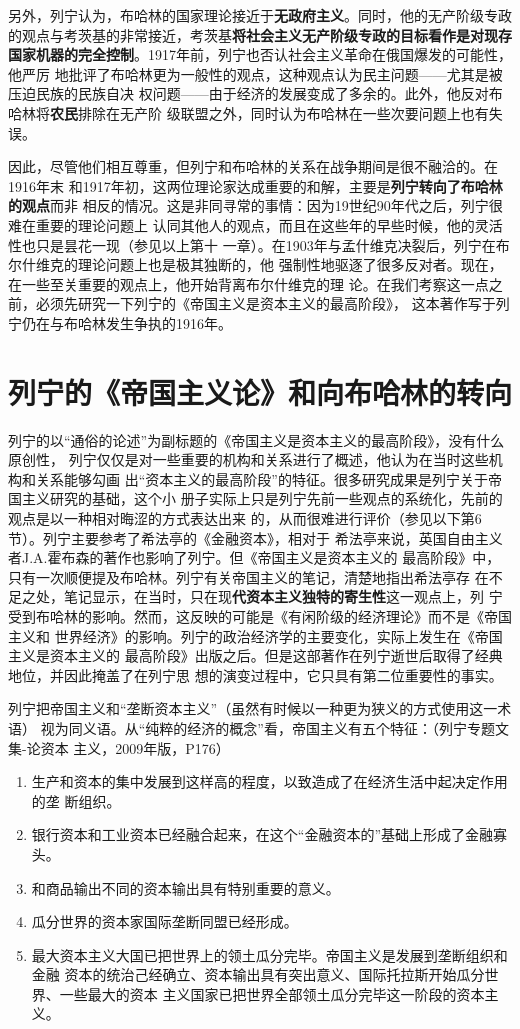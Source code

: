 另外，列宁认为，布哈林的国家理论接近于\textbf{无政府主义}。同时，他的无产阶级专政
的观点与考茨基的非常接近，考茨基\textbf{将社会主义无产阶级专政的目标看作是对现存
  国家机器的完全控制}。1917年前，列宁也否认社会主义革命在俄国爆发的可能性，他严厉
地批评了布哈林更为一般性的观点，这种观点认为民主问题——尤其是被压迫民族的民族自决
权问题——由于经济的发展变成了多余的。此外，他反对布哈林将\textbf{农民}排除在无产阶
级联盟之外，同时认为布哈林在一些次要问题上也有失误。

因此，尽管他们相互尊重，但列宁和布哈林的关系在战争期间是很不融洽的。在1916年末
和1917年初，这两位理论家达成重要的和解，主要是\textbf{列宁转向了布哈林的观点}而非
相反的情况。这是非同寻常的事情：因为19世纪90年代之后，列宁很难在重要的理论问题上
认同其他人的观点，而且在这些年的早些时候，他的灵活性也只是昙花一现（参见以上第十
一章）。在1903年与孟什维克决裂后，列宁在布尔什维克的理论问题上也是极其独断的，他
强制性地驱逐了很多反对者。现在，在一些至关重要的观点上，他开始背离布尔什维克的理
论。在我们考察这一点之前，必须先研究一下列宁的《帝国主义是资本主义的最高阶段》，
这本著作写于列宁仍在与布哈林发生争执的1916年。

\section{列宁的《帝国主义论》和向布哈林的转向}

列宁的以“通俗的论述”为副标题的《帝国主义是资本主义的最高阶段》，没有什么原创性，
列宁仅仅是对一些重要的机构和关系进行了概述，他认为在当时这些机构和关系能够勾画
出“资本主义的最高阶段”的特征。很多研究成果是列宁关于帝国主义研究的基础，这个小
册子实际上只是列宁先前一些观点的系统化，先前的观点是以一种相对晦涩的方式表达出来
的，从而很难进行评价（参见以下第6节）。列宁主要参考了希法亭的《金融资本》，相对于
希法亭来说，英国自由主义者J.A.霍布森的著作也影响了列宁。但《帝国主义是资本主义的
最高阶段》中，只有一次顺便提及布哈林。列宁有关帝国主义的笔记，清楚地指出希法亭存
在不足之处，笔记显示，在当时，只在现\textbf{代资本主义独特的寄生性}这一观点上，列
宁受到布哈林的影响。然而，这反映的可能是《有闲阶级的经济理论》而不是《帝国主义和
世界经济》的影响。列宁的政治经济学的主要变化，实际上发生在《帝国主义是资本主义的
最高阶段》出版之后。但是这部著作在列宁逝世后取得了经典地位，并因此掩盖了在列宁思
想的演变过程中，它只具有第二位重要性的事实。

列宁把帝国主义和“垄断资本主义”（虽然有时候以一种更为狭义的方式使用这一术语）
视为同义语。从“纯粹的经济的概念”看，帝国主义有五个特征：（列宁专题文集-论资本
主义，2009年版，P176）
\begin{enumerate}
  \item 生产和资本的集中发展到这样高的程度，以致造成了在经济生活中起决定作用的垄
断组织。
  \item 银行资本和工业资本已经融合起来，在这个“金融资本的”基础上形成了金融寡头。
  \item 和商品输出不同的资本输出具有特别重要的意义。
  \item 瓜分世界的资本家国际垄断同盟已经形成。
  \item 最大资本主义大国已把世界上的领土瓜分完毕。帝国主义是发展到垄断组织和金融
资本的统治己经确立、资本输出具有突出意义、国际托拉斯开始瓜分世界、一些最大的资本
主义国家已把世界全部领土瓜分完毕这一阶段的资本主义。
\end{enumerate}

